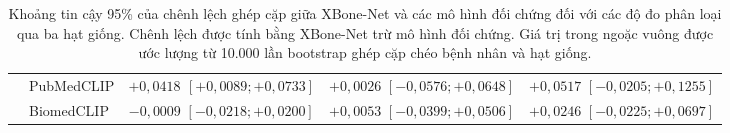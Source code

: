 \begin{table}[H]
{\begin{tabular}{|l|l|c|c|c|}
 & PubMedCLIP & \textbf{$+0{,}0418$ \scriptsize$[+0{,}0089; +0{,}0733]$} & $+0{,}0026$ \scriptsize$[-0{,}0576; +0{,}0648]$ & $+0{,}0517$ \scriptsize$[-0{,}0205; +0{,}1255]$ \\ \cline{2-5}
 & BiomedCLIP & $-0{,}0009$ \scriptsize$[-0{,}0218; +0{,}0200]$ & $+0{,}0053$ \scriptsize$[-0{,}0399; +0{,}0506]$ & $+0{,}0246$ \scriptsize$[-0{,}0225; +0{,}0697]$ \\ \hline
\end{tabular}%
}
\caption{Khoảng tin cậy 95\% của chênh lệch ghép cặp giữa XBone-Net và các mô hình đối chứng đối với các độ đo phân loại qua ba hạt giống. Chênh lệch được tính bằng XBone-Net trừ mô hình đối chứng. Giá trị trong ngoặc vuông được ước lượng từ 10.000 lần bootstrap ghép cặp chéo bệnh nhân và hạt giống.}
\label{tab:appendix-paired-baseline-classification-confidence-intervals}
\end{table}
